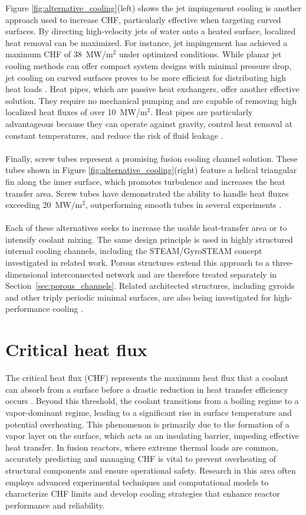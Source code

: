 \documentclass[a4paper]{article}
\begin{document}
\noindent Figure \ref{fig:alternative_cooling}(left) shows the jet impingement cooling is another approach used to increase CHF, particularly effective when targeting curved surfaces. By directing high-velocity jets of water onto a heated surface, localized heat removal can be maximized. For instance, jet impingement has achieved a maximum CHF of 38~MW/m$^2$ under optimized conditions. While planar jet cooling methods can offer compact system designs with minimal pressure drop, jet cooling on curved surfaces proves to be more efficient for distributing high heat loads \cite{Inoue2000}.
Heat pipes, which are passive heat exchangers, offer another effective solution. They require no mechanical pumping and are capable of removing high localized heat fluxes of over 10~MW/m$^2$. Heat pipes are particularly advantageous because they can operate against gravity, control heat removal at constant temperatures, and reduce the risk of fluid leakage \cite{osti_374458}.
\\
\\
\noindent Finally, screw tubes represent a promising fusion cooling channel solution. These tubes shown in Figure \ref{fig:alternative_cooling}(right) feature a helical triangular fin along the inner surface, which promotes turbulence and increases the heat transfer area. Screw tubes have demonstrated the ability to handle heat fluxes exceeding 20~MW/m$^2$, outperforming smooth tubes in several experiments \cite{Ezato2005}.
\\
\\
\noindent Each of these alternatives seeks to increase the usable heat-transfer area or to intensify coolant mixing. The same design principle is used in highly structured internal cooling channels, including the STEAM/GyroSTEAM concept investigated in related work. Porous structures extend this approach to a three-dimensional interconnected network and are therefore treated separately in Section~\ref{sec:porous_channels}. Related architected structures, including gyroids and other triply periodic minimal surfaces, are also being investigated for high-performance cooling \cite{Saghir2024}.
\pagebreak
\section{Critical heat flux}
The critical heat flux (CHF) represents the maximum heat flux that a coolant can absorb from a surface before a drastic reduction in heat transfer efficiency occurs \cite{Ciric}. 
Beyond this threshold, the coolant transitions from a boiling regime to a vapor-dominant regime, leading to a significant rise in surface temperature and potential overheating. 
This phenomenon is primarily due to the formation of a vapor layer on the surface, which acts as an insulating barrier, impeding effective heat transfer. In fusion reactors, where extreme thermal loads are common, accurately predicting and managing CHF is vital to prevent overheating of structural components and ensure operational safety. 
Research in this area often employs advanced experimental techniques and computational models to characterize CHF limits and develop cooling strategies that enhance reactor performance and reliability.
\end{document}
